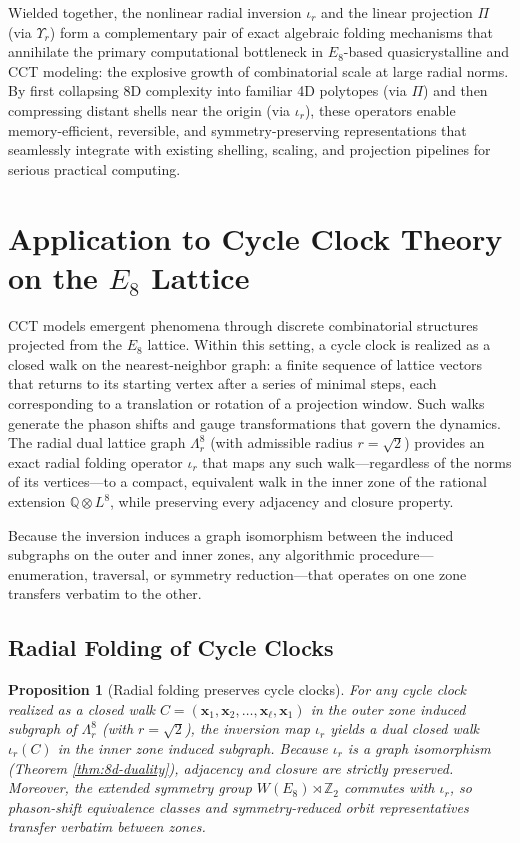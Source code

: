 \documentclass{article}
\newtheorem{proposition}{Proposition}
\begin{document}
Wielded together, the nonlinear radial inversion \(\iota_r\) and the linear projection \(\Pi\) (via \(\Upsilon_r\)) form a complementary pair of exact algebraic folding mechanisms that annihilate the primary computational bottleneck in \(E_8\)-based quasicrystalline and CCT modeling: the explosive growth of combinatorial scale at large radial norms. By first collapsing 8D complexity into familiar 4D polytopes (via \(\Pi\)) and then compressing distant shells near the origin (via \(\iota_r\)), these operators enable memory-efficient, reversible, and symmetry-preserving representations that seamlessly integrate with existing shelling, scaling, and projection pipelines for serious practical computing.

\section{Application to Cycle Clock Theory on the $E_8$ Lattice}
\label{sec:cct-application}
CCT models emergent phenomena through discrete combinatorial structures projected from the $E_8$ lattice. Within this setting, a cycle clock is realized as a closed walk on the nearest-neighbor graph: a finite sequence of lattice vectors that returns to its starting vertex after a series of minimal steps, each corresponding to a translation or rotation of a projection window. Such walks generate the phason shifts and gauge transformations that govern the dynamics. The radial dual lattice graph $\Lambda_r^8$ (with admissible radius $r = \sqrt{2}$) provides an exact radial folding operator $\iota_r$ that maps any such walk---regardless of the norms of its vertices---to a compact, equivalent walk in the inner zone of the rational extension $\mathbb{Q} \otimes L^8$, while preserving every adjacency and closure property.

Because the inversion induces a graph isomorphism between the induced subgraphs on the outer and inner zones, any algorithmic procedure---enumeration, traversal, or symmetry reduction---that operates on one zone transfers verbatim to the other.

\subsection{Radial Folding of Cycle Clocks}
\label{subsec:cct-radial-folding}

\begin{proposition}[Radial folding preserves cycle clocks]
\label{prop:radial-folding-preserves}
For any cycle clock realized as a closed walk $C = (\mathbf{x}_1, \mathbf{x}_2, \dots, \mathbf{x}_\ell, \mathbf{x}_1)$ in the outer zone induced subgraph of $\Lambda_r^8$ (with $r = \sqrt{2}$), the inversion map $\iota_r$ yields a dual closed walk $\iota_r(C)$ in the inner zone induced subgraph. Because $\iota_r$ is a graph isomorphism (Theorem \ref{thm:8d-duality}), adjacency and closure are strictly preserved. Moreover, the extended symmetry group $W(E_8) \rtimes \mathbb{Z}_2$ commutes with $\iota_r$, so phason-shift equivalence classes and symmetry-reduced orbit representatives transfer verbatim between zones.
\end{proposition}
\end{document}
